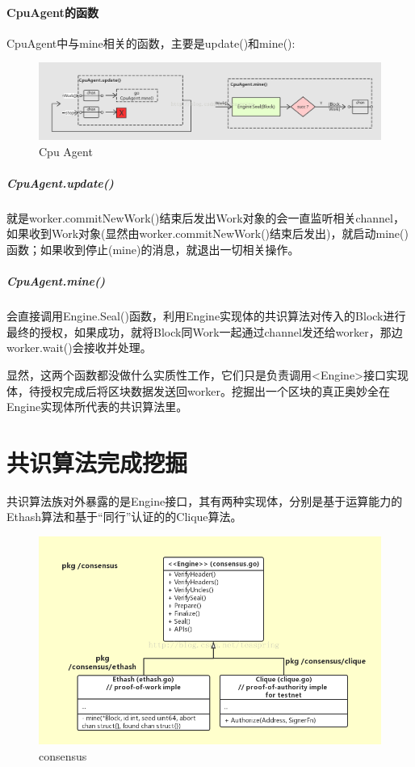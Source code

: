 \documentclass[UTF8]{ctexart}
\begin{document}
\paragraph{CpuAgent的函数}

CpuAgent中与mine相关的函数，主要是update()和mine():

\begin{figure}
	\centering
	\includegraphics[scale=0.3]{cpuagent.png}
	\caption{Cpu Agent}
	\label{cpuAgent}
\end{figure}

\subparagraph{CpuAgent.update()}就是worker.commitNewWork()结束后发出Work对象的会一直监听相关channel，如果收到Work对象(显然由worker.commitNewWork()结束后发出)，就启动mine()函数；如果收到停止(mine)的消息，就退出一切相关操作。

\subparagraph{CpuAgent.mine()}会直接调用Engine.Seal()函数，利用Engine实现体的共识算法对传入的Block进行最终的授权，如果成功，就将Block同Work一起通过channel发还给worker，那边worker.wait()会接收并处理。

显然，这两个函数都没做什么实质性工作，它们只是负责调用<Engine>接口实现体，待授权完成后将区块数据发送回worker。挖掘出一个区块的真正奥妙全在Engine实现体所代表的共识算法里。

\section{共识算法完成挖掘}

共识算法族对外暴露的是Engine接口，其有两种实现体，分别是基于运算能力的Ethash算法和基于“同行”认证的的Clique算法。

\begin{figure}
	\centering
	\includegraphics[scale=0.5]{consensus.png}
	\caption{consensus}
	\label{consensus}
\end{figure}
\end{document}
